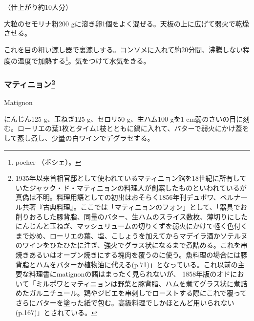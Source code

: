 \begin{recette}
\begin{frsubenv}
\end{frsubenv}


（仕上がり約10人分）

大粒のセモリナ粉200
gに溶き卵1個をよく混ぜる。天板の上に広げて弱火で乾燥させる。

これを目の粗い漉し器で裏漉しする。コンソメに入れて約20分間、沸騰しない程度の温度で加熱する\footnote{pocher
  （ポシェ）。}。気をつけて水気をきる。

\atoaki{}

\hypertarget{matignon}{%
\subsubsection[マティニョン]{\texorpdfstring{マティニョン\footnote{1935年以来首相官邸として使われているマティニョン館を18世紀に所有していたジャック・ド・マティニョンの料理人が創案したものといわれているが真偽は不明。料理用語としての初出はおそらく1856年刊デュボワ、ベルナール共著『古典料理』。ここでは「マティニョンのフォン」として、「器具でお削りおろした豚背脂、同量のバター、生ハムのスライス数枚、薄切りにしたにんじんと玉ねぎ、マッシュリュームの切りくずを弱火にかけて軽く色付くまで炒め、ローリエの葉、塩、こしょうを加えてからマデイラ酒かソテルヌのワインをひたひたに注ぎ、強火でグラス状になるまで煮詰める。これを串焼きあるいはオーブン焼きにする塊肉を覆うのに使う。魚料理の場合には豚背脂とハムをバターか植物油に代える(p.71)」となっている。これ以前の主要な料理書にmatignonの語はまったく見られないが、
  1858年版のオドにおいて「ミルポワとマティニョンは野菜と豚背脂、ハムを煮てグラス状に煮詰めたガルニチュール。鶏やジビエを串刺しでローストする際にこれで覆ってさらにバターを塗った紙で包む。高級料理でしかほとんど用いられない(p.167)」とされている。}}{マティニョン}}\label{matignon}}

\begin{frsubenv}

Matignon

\end{frsubenv}

 

にんじん125 g、玉ねぎ125 g、セロリ50 g、生ハム100 gを1
cm弱のさいの目に刻む。ローリエの葉1枚とタイム1枝とともに鍋に入れて、バターで弱火にかけ蓋をして蒸し煮し、少量の白ワインでデグラセする。


\end{recette}
